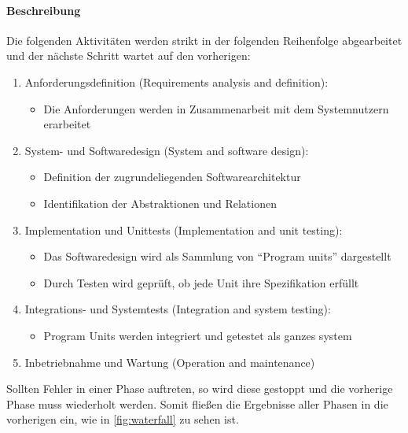 \documentclass[
    ngerman,
    color=3b,
    summary,
    boxarc,
    main,
]{rubos-tuda-template}
\begin{document}
\paragraph{Beschreibung}
Die folgenden Aktivitäten werden strikt in der folgenden Reihenfolge abgearbeitet und der nächste Schritt wartet auf den vorherigen:
\begin{enumerate}
    \item Anforderungsdefinition (Requirements analysis and definition):\begin{itemize}
              \item Die Anforderungen werden in Zusammenarbeit mit dem Systemnutzern erarbeitet
          \end{itemize}
    \item System- und Softwaredesign (System and software design):\begin{itemize}
              \item Definition der zugrundeliegenden Softwarearchitektur
              \item Identifikation der Abstraktionen und Relationen
          \end{itemize}
    \item Implementation und Unittests (Implementation and unit
          testing):\begin{itemize}
              \item Das Softwaredesign wird als Sammlung von \enquote{Program units} dargestellt
              \item Durch Testen wird geprüft, ob jede Unit ihre Spezifikation erfüllt
          \end{itemize}
    \item Integrations- und Systemtests (Integration and system
          testing):\begin{itemize}
              \item Program Units werden integriert und getestet als ganzes system
          \end{itemize}
    \item Inbetriebnahme und Wartung (Operation and maintenance)
\end{enumerate}

Sollten Fehler in einer Phase auftreten, so wird diese gestoppt und die vorherige Phase muss wiederholt werden. Somit fließen die Ergebnisse aller Phasen in die vorherigen ein, wie in \ref{fig:waterfall} zu sehen ist.
\end{document}
